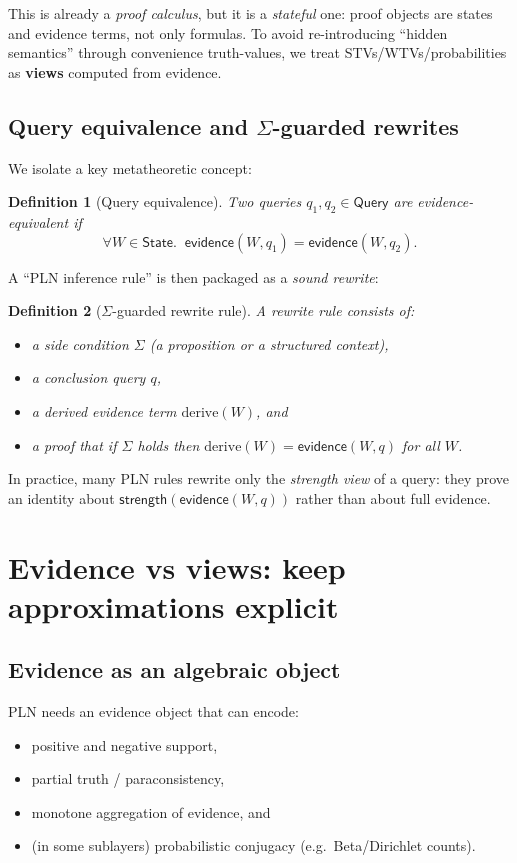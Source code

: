 \documentclass[11pt]{article}
\newtheorem{definition}{Definition}
\newcommand{\State}{\mathsf{State}}
\newcommand{\Query}{\mathsf{Query}}
\newcommand{\Strength}{\mathsf{strength}}
\newcommand{\ev}{\mathsf{evidence}}
\newcommand{\side}{\Sigma}
\begin{document}
This is already a \emph{proof calculus}, but it is a \emph{stateful} one:
proof objects are states and evidence terms, not only formulas.
To avoid re-introducing ``hidden semantics'' through convenience truth-values,
we treat STVs/WTVs/probabilities as \textbf{views} computed from evidence.

\subsection{Query equivalence and $\Sigma$-guarded rewrites}

We isolate a key metatheoretic concept:

\begin{definition}[Query equivalence]
Two queries $q_1,q_2\in\Query$ are \emph{evidence-equivalent} if
\[
  \forall W\in\State.\;\; \ev(W,q_1)=\ev(W,q_2).
\]
\end{definition}

A ``PLN inference rule'' is then packaged as a \emph{sound rewrite}:

\begin{definition}[$\Sigma$-guarded rewrite rule]
A rewrite rule consists of:
\begin{itemize}[leftmargin=2em]
\item a side condition $\side$ (a proposition or a structured context),
\item a conclusion query $q$,
\item a derived evidence term $\mathrm{derive}(W)$, and
\item a proof that if $\side$ holds then $\mathrm{derive}(W)=\ev(W,q)$ for all $W$.
\end{itemize}
\end{definition}

In practice, many PLN rules rewrite only the \emph{strength view} of a query:
they prove an identity about $\Strength(\ev(W,q))$ rather than about full evidence.

\section{Evidence vs views: keep approximations explicit}

\subsection{Evidence as an algebraic object}

PLN needs an evidence object that can encode:
\begin{itemize}[leftmargin=2em]
\item positive and negative support,
\item partial truth / paraconsistency,
\item monotone aggregation of evidence, and
\item (in some sublayers) probabilistic conjugacy (e.g.\ Beta/Dirichlet counts).
\end{itemize}
\end{document}
